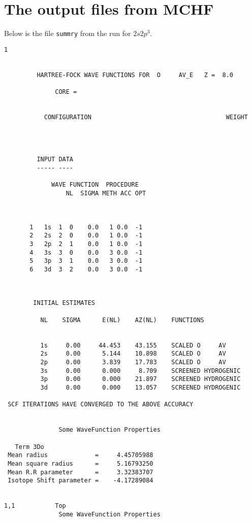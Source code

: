 \documentclass[fleqn,10pt]{book}
\begin{document}
\section{The output files from MCHF}
Below is the file \verb+summry+ from the run for $2s2p^3$. 
\begin{verbatim}
1                                                                                                                                                                                             


         HARTREE-FOCK WAVE FUNCTIONS FOR  O     AV_E   Z =  8.0

              CORE = 


           CONFIGURATION                                     WEIGHT




         INPUT DATA
         ----- ----

             WAVE FUNCTION  PROCEDURE
                 NL  SIGMA METH ACC OPT



       1   1s  1  0    0.0   1 0.0  -1
       2   2s  2  0    0.0   1 0.0  -1
       3   2p  2  1    0.0   1 0.0  -1
       4   3s  3  0    0.0   3 0.0  -1
       5   3p  3  1    0.0   3 0.0  -1
       6   3d  3  2    0.0   3 0.0  -1



        INITIAL ESTIMATES 

          NL    SIGMA      E(NL)    AZ(NL)    FUNCTIONS


          1s     0.00     44.453    43.155    SCALED O     AV        
          2s     0.00      5.144    10.898    SCALED O     AV        
          2p     0.00      3.839    17.783    SCALED O     AV        
          3s     0.00      0.000     8.709    SCREENED HYDROGENIC    
          3p     0.00      0.000    21.897    SCREENED HYDROGENIC    
          3d     0.00      0.000    13.057    SCREENED HYDROGENIC    

 SCF ITERATIONS HAVE CONVERGED TO THE ABOVE ACCURACY


               Some WaveFunction Properties

   Term 3Do
 Mean radius             =     4.45705988
 Mean square radius      =     5.16793250
 Mean R.R parameter      =     3.32383707
 Isotope Shift parameter =    -4.17289084

                                                                                                                                                                            1,1           Top
               Some WaveFunction Properties


\end{verbatim}
\end{document}
